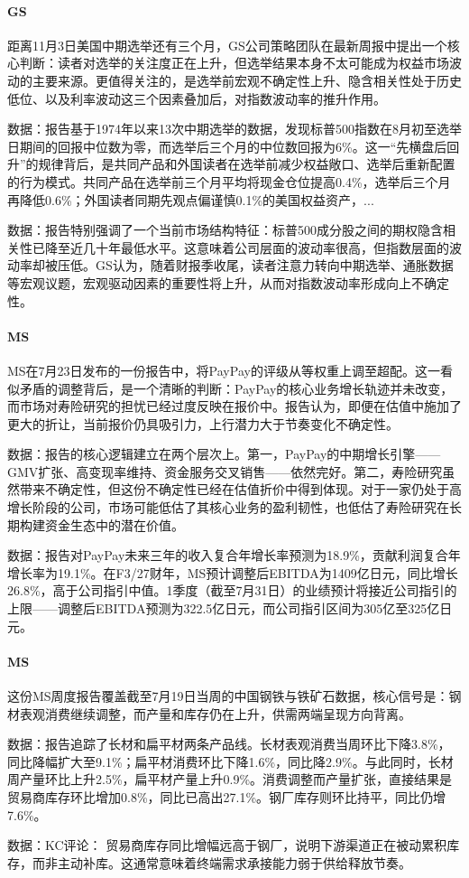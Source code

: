\documentclass[11pt]{ctexart}
\begin{document}
\paragraph{GS} 距离11月3日美国中期选举还有三个月，GS公司策略团队在最新周报中提出一个核心判断：读者对选举的关注度正在上升，但选举结果本身不太可能成为权益市场波动的主要来源。更值得关注的，是选举前宏观不确定性上升、隐含相关性处于历史低位、以及利率波动这三个因素叠加后，对指数波动率的推升作用。
{\small\color{refgray}数据：报告基于1974年以来13次中期选举的数据，发现标普500指数在8月初至选举日期间的回报中位数为零，而选举后三个月的中位数回报为6\%。这一“先横盘后回升”的规律背后，是共同产品和外国读者在选举前减少权益敞口、选举后重新配置的行为模式。共同产品在选举前三个月平均将现金仓位提高0.4\%，选举后三个月再降低0.6\%；外国读者同期先观点偏谨慎0.1\%的美国权益资产，...\par}
{\small\color{refgray}数据：报告特别强调了一个当前市场结构特征：标普500成分股之间的期权隐含相关性已降至近几十年最低水平。这意味着公司层面的波动率很高，但指数层面的波动率却被压低。GS认为，随着财报季收尾，读者注意力转向中期选举、通胀数据等宏观议题，宏观驱动因素的重要性将上升，从而对指数波动率形成向上不确定性。\par}
\paragraph{MS} MS在7月23日发布的一份报告中，将PayPay的评级从等权重上调至超配。这一看似矛盾的调整背后，是一个清晰的判断：PayPay的核心业务增长轨迹并未改变，而市场对寿险研究的担忧已经过度反映在报价中。报告认为，即便在估值中施加了更大的折让，当前报价仍具吸引力，上行潜力大于节奏变化不确定性。
{\small\color{refgray}数据：报告的核心逻辑建立在两个层次上。第一，PayPay的中期增长引擎——GMV扩张、高变现率维持、资金服务交叉销售——依然完好。第二，寿险研究虽然带来不确定性，但这份不确定性已经在估值折价中得到体现。对于一家仍处于高增长阶段的公司，市场可能低估了其核心业务的盈利韧性，也低估了寿险研究在长期构建资金生态中的潜在价值。\par}
{\small\color{refgray}数据：报告对PayPay未来三年的收入复合年增长率预测为18.9\%，贡献利润复合年增长率为19.1\%。在F3/27财年，MS预计调整后EBITDA为1409亿日元，同比增长26.8\%，高于公司指引中值。1季度（截至7月31日）的业绩预计将接近公司指引的上限——调整后EBITDA预测为322.5亿日元，而公司指引区间为305亿至325亿日元。\par}
\paragraph{MS} 这份MS周度报告覆盖截至7月19日当周的中国钢铁与铁矿石数据，核心信号是：钢材表观消费继续调整，而产量和库存仍在上升，供需两端呈现方向背离。
{\small\color{refgray}数据：报告追踪了长材和扁平材两条产品线。长材表观消费当周环比下降3.8\%，同比降幅扩大至9.1\%；扁平材消费环比下降1.6\%，同比降2.9\%。与此同时，长材周产量环比上升2.5\%，扁平材产量上升0.9\%。消费调整而产量扩张，直接结果是贸易商库存环比增加0.8\%，同比已高出27.1\%。钢厂库存则环比持平，同比仍增7.6\%。\par}
{\small\color{refgray}数据：KC评论： 贸易商库存同比增幅远高于钢厂，说明下游渠道正在被动累积库存，而非主动补库。这通常意味着终端需求承接能力弱于供给释放节奏。\par}
\end{document}
